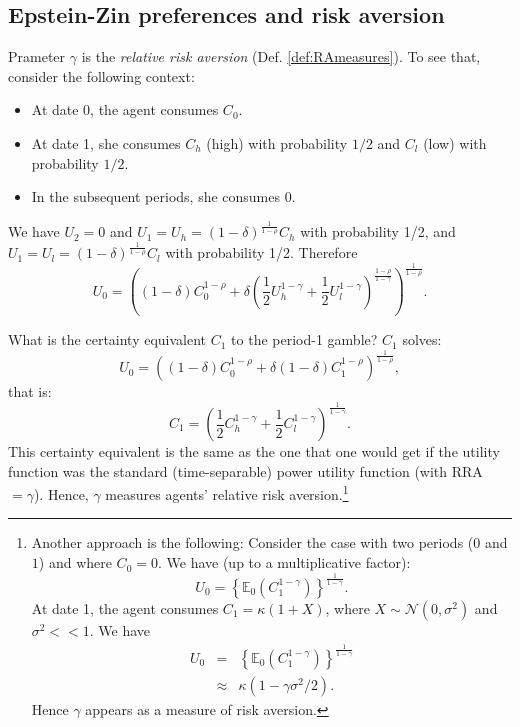 \documentclass[
  12pt,
]{book}
\providecommand{\tightlist}{%
  \setlength{\itemsep}{0pt}\setlength{\parskip}{0pt}}
\theoremstyle{definition}
\theoremstyle{definition}
\theoremstyle{definition}
\theoremstyle{definition}
\theoremstyle{remark}
\begin{document}
\hypertarget{epstein-zin-preferences-and-risk-aversion}{%
\subsection{Epstein-Zin preferences and risk aversion}\label{epstein-zin-preferences-and-risk-aversion}}

Prameter \(\gamma\) is the \emph{relative risk aversion} (Def. \ref{def:RAmeasures}). To see that, consider the following context:

\begin{itemize}
\tightlist
\item
  At date 0, the agent consumes \(C_0\).
\item
  At date 1, she consumes \(C_h\) (high) with probability \(1/2\) and \(C_l\) (low) with probability \(1/2\).
\item
  In the subsequent periods, she consumes 0.
\end{itemize}

We have \(U_2 = 0\) and \(U_1 = U_h = (1-\delta)^{\frac{1}{1-\rho}}C_h\) with probability 1/2, and \(U_1 = U_l = (1-\delta)^{\frac{1}{1-\rho}}C_l\) with probability 1/2. Therefore
\[
U_0 =  \left((1-\delta)C_0^{1-\rho} + \delta \left(\frac{1}{2}U_h^{1-\gamma}+\frac{1}{2}U_l^{1-\gamma}\right)^{\frac{1-\rho}{1-\gamma}}\right)^{\frac{1}{1-\rho}}.
\]

What is the certainty equivalent \(C_1\) to the period-1 gamble? \(C_1\) solves:
\[
U_0 = \left((1-\delta)C_0^{1-\rho} + \delta (1-\delta) C_1^{1-\rho}\right)^{\frac{1}{1-\rho}},
\]
that is:
\[
C_1 = \left(\frac{1}{2}C_h^{1-\gamma}+\frac{1}{2}C_l^{1-\gamma}\right)^{\frac{1}{1-\gamma}}.
\]
This certainty equivalent is the same as the one that one would get if the utility function was the standard (time-separable) power utility function (with RRA \(= \gamma\)).
Hence, \(\gamma\) measures agents' relative risk aversion.\footnote{Another approach is the following: Consider the case with two periods (\(0\) and \(1\)) and where \(C_0=0\). We have (up to a multiplicative factor):
  \[
  U_0 = \left\{\mathbb{E}_0(C_{1}^{1-\gamma})\right\}^{\frac{1}{1-\gamma}}.
  \]
  At date 1, the agent consumes \(C_1 = \kappa(1+X)\), where \(X \sim \mathcal{N}(0,\sigma^2)\) and \(\sigma^2<<1\). We have
  \begin{eqnarray*}
  U_0 &=& \left\{\mathbb{E}_0(C_{1}^{1-\gamma})\right\}^{\frac{1}{1-\gamma}}\\
  &\approx& \kappa (1-\gamma\sigma^2/2).
  \end{eqnarray*}
  Hence \(\gamma\) appears as a measure of risk aversion.}
\end{document}
